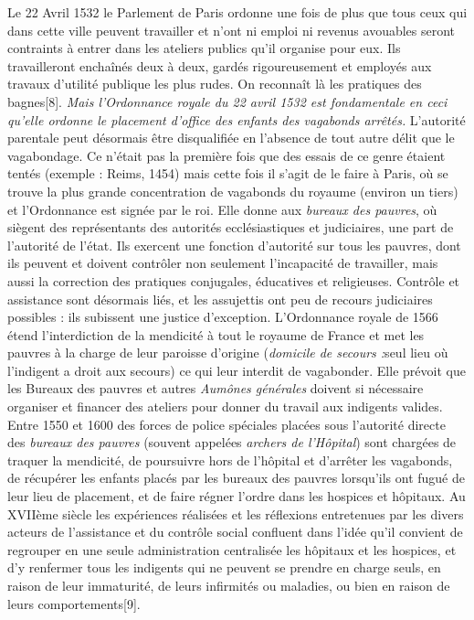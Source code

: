  Le 22 Avril 1532 le Parlement de Paris ordonne une fois de plus que tous ceux qui dans cette ville peuvent travailler et n'ont ni emploi ni revenus avouables seront contraints à entrer dans les ateliers publics qu'il organise pour eux. Ils travailleront enchaînés deux à deux, gardés rigoureusement et employés aux travaux d'utilité publique les plus rudes. On reconnaît là les pratiques des bagnes[8]. \emph{Mais l'Ordonnance royale du 22 avril 1532 est fondamentale en ceci qu'elle ordonne le placement d'office des enfants des vagabonds arrêtés.} L'autorité parentale peut désormais être disqualifiée en l'absence de tout autre délit que le vagabondage. Ce n'était pas la première fois que des essais de ce genre étaient tentés (exemple : Reims, 1454) mais cette fois il s'agit de le faire à Paris, où se trouve la plus grande concentration de vagabonds du royaume (environ un tiers) et l'Ordonnance est signée par le roi. Elle donne aux \emph{bureaux des pauvres}, où siègent des représentants des autorités ecclésiastiques et judiciaires, une part de l'autorité de l'état. Ils exercent une fonction d'autorité sur tous les pauvres, dont ils peuvent et doivent contrôler non seulement l'incapacité de travailler, mais aussi la correction des pratiques conjugales, éducatives et religieuses. Contrôle et assistance sont désormais liés, et les assujettis ont peu de recours judiciaires possibles : ils subissent une justice d'exception. 
 L'Ordonnance royale de 1566 étend l'interdiction de la mendicité à tout le royaume de France et met les pauvres à la charge de leur paroisse d'origine (\emph{domicile de secours :}seul lieu où l'indigent a droit aux secours) ce qui leur interdit de vagabonder. Elle prévoit que les Bureaux des pauvres et autres \emph{Aumônes générales} doivent si nécessaire organiser et financer des ateliers pour donner du travail aux indigents valides. Entre 1550 et 1600 des forces de police spéciales placées sous l'autorité directe des \emph{bureaux des pauvres} (souvent appelées \emph{archers de l'Hôpital}) sont chargées de traquer la mendicité, de poursuivre hors de l'hôpital et d'arrêter les vagabonds, de récupérer les enfants placés par les bureaux des pauvres lorsqu'ils ont fugué de leur lieu de placement, et de faire régner l'ordre dans les hospices et hôpitaux. 
 Au XVIIème siècle les expériences réalisées et les réflexions entretenues par les divers acteurs de l'assistance et du contrôle social confluent dans l'idée qu'il convient de regrouper en une seule administration centralisée les hôpitaux et les hospices, et d'y renfermer tous les indigents qui ne peuvent se prendre en charge seuls, en raison de leur immaturité, de leurs infirmités ou maladies, ou bien en raison de leurs comportements[9]. 
